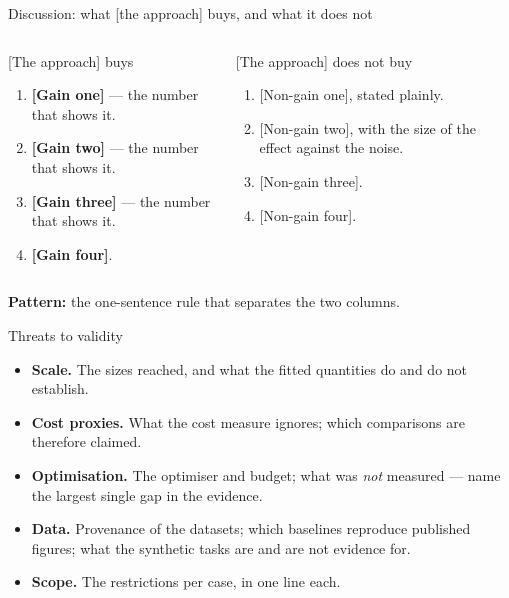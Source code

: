 \documentclass[aspectratio=43, 11pt, xcolor=dvipsnames, compress]{beamer}
\begin{document}
\begin{frame}{Discussion: what [the approach] buys, and what it does not}
  \footnotesize
  \begin{columns}[T]
      \begin{block}{[The approach] buys}
        \begin{enumerate}
          \item \textbf{[Gain one]} --- the number that shows it.
          \item \textbf{[Gain two]} --- the number that shows it.
          \item \textbf{[Gain three]} --- the number that shows it.
          \item \textbf{[Gain four]}.
        \end{enumerate}
      \end{block}
      \begin{alertblock}{[The approach] does not buy}
        \begin{enumerate}
          \item {}[Non-gain one], stated plainly.
          \item {}[Non-gain two], with the size of the effect against the noise.
          \item {}[Non-gain three].
          \item {}[Non-gain four].
        \end{enumerate}
      \end{alertblock}
  \end{columns}
  \vskip0.2cm
  \begin{center}
    \textbf{Pattern:} the one-sentence rule that separates the two columns.
  \end{center}
\end{frame}

\begin{frame}{Threats to validity}
  \small
  \begin{itemize}
    \item \textbf{Scale.} The sizes reached, and what the fitted quantities do and do not establish.
    \item \textbf{Cost proxies.} What the cost measure ignores; which comparisons are therefore claimed.
    \item \textbf{Optimisation.} The optimiser and budget; what was \emph{not} measured --- name the largest single gap in the evidence.
    \item \textbf{Data.} Provenance of the datasets; which baselines reproduce published figures; what the synthetic tasks are and are not evidence for.
    \item \textbf{Scope.} The restrictions per case, in one line each.
  \end{itemize}
\end{frame}
\end{document}
